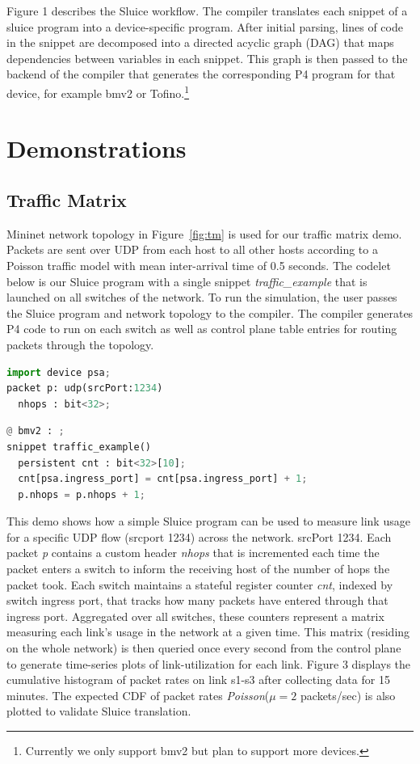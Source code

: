 Figure 1 describes the Sluice workflow. The compiler translates each snippet of
a sluice program into a device-specific program. After initial parsing, lines
of code in the snippet are decomposed into a directed acyclic graph (DAG) that
maps dependencies between variables in each snippet. This graph is then passed
to the backend of the compiler that generates the corresponding P4 program for
that device, for example bmv2 or Tofino.\footnote{Currently we only support
bmv2 but plan to support more devices.} 
\vspace{-0.05in}
\section{Demonstrations}
 
\subsection{Traffic Matrix}

Mininet network topology in Figure~\ref{fig:tm} is used for our traffic matrix demo.
Packets are sent over UDP from each host to all other hosts according to a
Poisson traffic model with mean inter-arrival time of 0.5 seconds. The codelet
below is our Sluice program with a single snippet \textit{traffic\_example}
that is launched on all switches of the network. To run the simulation, the
user passes the Sluice program and network topology to the compiler. The
compiler generates P4 code to run on each switch as well as control plane table entries for routing packets through the topology.
\vspace{-0.05in}
\begin{lstlisting}[language=Python, basicstyle=\scriptsize]
import device psa;
packet p: udp(srcPort:1234)
  nhops : bit<32>;
\end{lstlisting}
\vspace{-0.05in}
\begin{lstlisting}[language=Python, basicstyle=\scriptsize]
@ bmv2 : ;
snippet traffic_example()
  persistent cnt : bit<32>[10];
  cnt[psa.ingress_port] = cnt[psa.ingress_port] + 1;
  p.nhops = p.nhops + 1;
\end{lstlisting}
\vspace{-0.05in}
This demo shows how a simple Sluice program can be used to measure link usage for a specific UDP flow (srcport 1234) across the network.
srcPort 1234. Each packet \textit{p} contains a custom header \textit{nhops}
that is incremented each time the packet enters a switch to inform the
receiving host of the number of hops the packet took. Each switch maintains a
stateful register counter \textit{cnt}, indexed by switch ingress port, that
tracks how many packets have entered through that ingress port. Aggregated over all switches, these counters represent a matrix measuring each link's
usage in the network at a given time. This matrix (residing on the whole
network) is then queried once every second from the control plane to generate
time-series plots of link-utilization for each link. Figure 3 displays the cumulative histogram of packet rates on link s1-s3 after collecting data for 15 minutes. The expected CDF of packet rates \textit{Poisson}($\mu = 2$
packets/sec) is also plotted to validate Sluice translation.

